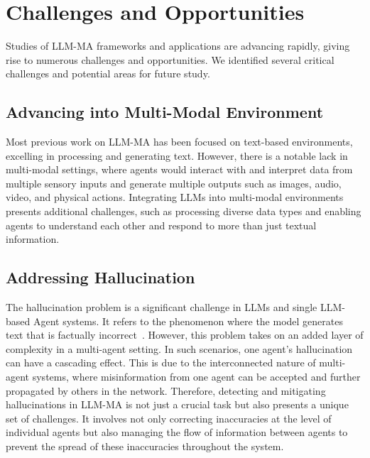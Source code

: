 \section{Challenges and Opportunities}
\label{Sec7:Challenges and Opportunities}
Studies of LLM-MA frameworks and applications are 
advancing rapidly, giving rise to numerous challenges and opportunities.   We identified several critical challenges and potential areas for future study.  

\subsection{Advancing into  Multi-Modal Environment}

Most previous work on LLM-MA has been focused on text-based environments, excelling in processing and generating text. However, there is a notable lack in multi-modal settings, where agents would interact with and interpret data from multiple sensory inputs and generate multiple outputs such as images, audio, video, and physical actions. Integrating LLMs into multi-modal environments presents additional challenges, such as processing diverse data types and enabling agents to understand each other and respond to more than just textual information. 

\subsection{Addressing Hallucination}
The hallucination problem is a significant challenge in LLMs and single LLM-based Agent systems. It refers to the phenomenon where the model generates text that is factually incorrect~\cite{huang2023survey}. However, this problem takes on an added layer of complexity in a multi-agent setting. In such scenarios, one agent's hallucination can have a cascading effect. This is due to the interconnected nature of multi-agent systems, where misinformation from one agent can be accepted and further propagated by others in the network. 
Therefore, detecting and mitigating hallucinations in LLM-MA is not just a crucial task but also presents a unique set of challenges. It involves not only correcting inaccuracies at the level of individual agents but also managing the flow of information between agents to prevent the spread of these inaccuracies throughout the system.

